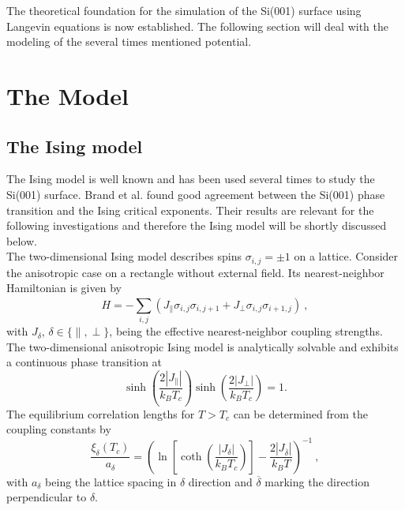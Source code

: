	The theoretical foundation for the simulation of the Si(001) surface using Langevin equations is now established. The following section will deal with the modeling of the several times mentioned potential.
	\section{The Model}
	\subsection{The Ising model}
	The Ising model is well known and has been used several times \cite{brand2023dimer, pillay2004revisit, ihm1983structural, schaller2023sequential} to study the Si(001) surface. Brand et al. \cite{brand2023critical} found good agreement between the Si(001) phase transition and the Ising critical exponents.  Their results are relevant for the following investigations and therefore the Ising model will be shortly discussed below. \\
	
	The two-dimensional Ising model describes spins $\sigma_{i ,j} =	\pm 1$ on a lattice. Consider the anisotropic case on a rectangle without external field. Its nearest-neighbor Hamiltonian is given by
	\begin{equation} \label{Eq::Ising-Hamiltonian}
		H =	- \sum_{i,j}^{} \left(J_\parallel \sigma_{i ,j} \sigma_{i ,j + 1} + J_\perp \sigma_{i, j} \sigma_{i +1 ,j} \right) ~,
	\end{equation}
	with $J_{\delta}$, $\delta \in \{\parallel, \perp\}$, being the effective nearest-neighbor coupling strengths. The two-dimensional anisotropic Ising model is analytically solvable \cite{onsager1944crystal} and exhibits a continuous phase transition at
	\begin{equation} \label{Eq::Crit-Temp-Ising}
		\sinh \left( \frac{2 |J_\parallel|}{k_B T_c} \right) \sinh \left( \frac{2 |J_\perp|}{k_B T_c}\right) =	1.
	\end{equation}
	The equilibrium correlation lengths for $T > T_c$ can be determined from the coupling constants \cite{mccoy1973two} by
	\begin{equation} \label{Eq::Ising-Corrlength-Coupling}
		\frac{\xi_\delta(T_c)}{a_\delta} =	\left(\ln \left[ \coth \left(\frac{|J_\delta|}{k_B T_c}\right)\right] - \frac{2 |J_{\overline{\delta}}|}{k_B T}\right)^{-1} ~,
	\end{equation}
	with $a_\delta$ being the lattice spacing in $\delta$ direction and $\overline{\delta}$ marking the direction perpendicular to $\delta$. \\
	
